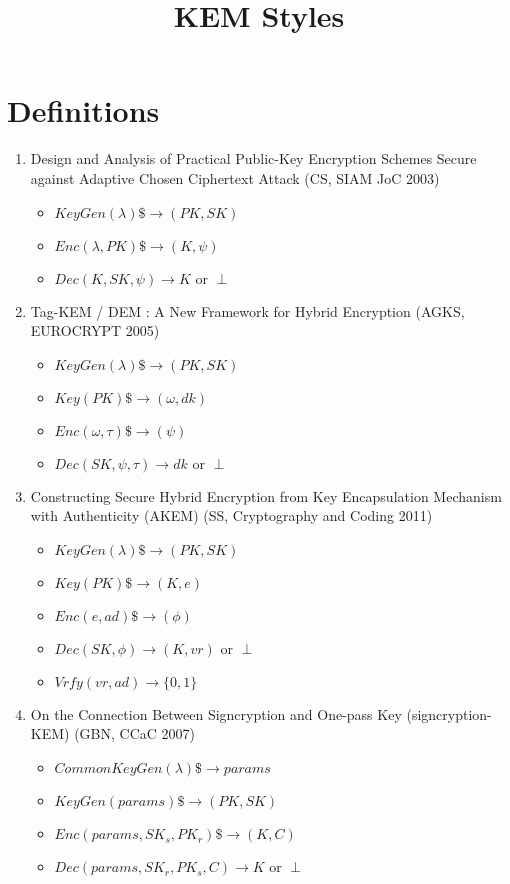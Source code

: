 \documentclass[11pt, pdftex]{article}
\title{KEM Styles}
\author{}
\date{}
\begin{document}
\maketitle

\section{Definitions}

\begin{enumerate}
\item Design and Analysis of Practical Public-Key Encryption Schemes Secure against Adaptive Chosen Ciphertext Attack (CS, SIAM JoC 2003)
\begin{itemize}
\item $KeyGen(\lambda) \$\rightarrow (PK, SK)$
\item $Enc(\lambda, PK) \$\rightarrow (K, \psi)$
\item $Dec(K, SK, \psi) \rightarrow K \text{ or } \perp$
\end{itemize}

\item Tag-KEM / DEM : A New Framework for Hybrid Encryption (AGKS, EUROCRYPT 2005)
\begin{itemize}
\item $KeyGen(\lambda) \$\rightarrow (PK, SK)$
\item $Key(PK) \$\rightarrow (\omega, dk)$
\item $Enc(\omega, \tau) \$\rightarrow (\psi)$
\item $Dec(SK, \psi, \tau) \rightarrow dk \text{ or } \perp$
\end{itemize}

\item Constructing Secure Hybrid Encryption from Key Encapsulation Mechanism with Authenticity (AKEM) (SS, Cryptography and Coding 2011)
\begin{itemize}
\item $KeyGen(\lambda) \$\rightarrow (PK, SK)$
\item $Key(PK) \$\rightarrow (K, e)$
\item $Enc(e, ad) \$\rightarrow (\phi)$
\item $Dec(SK, \phi) \rightarrow (K, vr) \text{ or }\perp$
\item $Vrfy(vr, ad) \rightarrow \{0,1\}$
\end{itemize}

\item On the Connection Between Signcryption and One-pass Key (signcryption-KEM) (GBN, CCaC 2007)
\begin{itemize}
\item $CommonKeyGen(\lambda) \$\rightarrow params$
\item $KeyGen(params) \$\rightarrow (PK, SK)$
\item $Enc(params, SK_s, PK_r) \$\rightarrow (K, C)$
\item $Dec(params, SK_r, PK_s, C) \rightarrow K \text{ or }\perp$
\end{itemize}


\end{enumerate}
\end{document}
